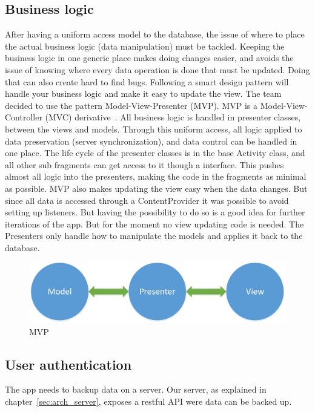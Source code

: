 \subsection{Business logic}
After having a uniform access model to the database, the issue of where to place the actual business logic (data manipulation) must be tackled. Keeping the business logic in one generic place makes doing changes easier, and avoids the issue of knowing where every data operation is done that must be updated. Doing that can also create hard to find bugs. Following a smart design pattern will handle your business logic and make it easy to update the view. 
The team decided to use the pattern Model-View-Presenter (MVP). MVP is a Model-View-Controller (MVC) derivative~\cite{mvc}. All business logic is handled in presenter classes, between the views and models. Through this uniform access, all logic applied to data preservation (server synchronization), and data control can be handled in one place. The life cycle of the presenter classes is in the base Activity class, and all other sub fragments can get access to it though a interface. 
This pushes almost all logic into the presenters, making the code in the fragments as minimal as possible. 
MVP also makes updating the view easy when the data changes. But since all data is accessed through a ContentProvider it was possible to avoid setting up listeners. But having the possibility to do so is a good idea for further iterations of the app. But for the moment no view updating code is needed. The Presenters only handle how to manipulate the models and applies it back to the database.

\begin{figure}[H]
\includegraphics[width=\textwidth]{ch/architecture/fig/mvp.png}
\caption{MVP}
\label{fig:mvp}
\end{figure}

\subsection{User authentication}
The app needs to backup data on a server. Our server, as explained in chapter~\ref{sec:arch_server}, exposes a restful API were data can be backed up.

